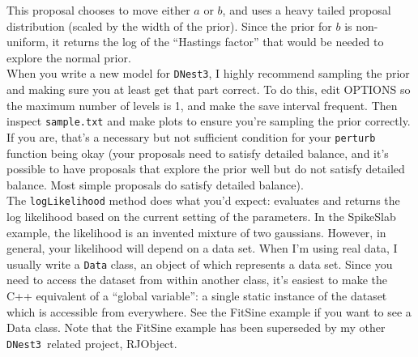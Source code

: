 \documentclass[a4paper, 11pt]{article}
\newcommand{\dnest}{{\tt DNest3}}
\begin{document}
This proposal chooses to move either $a$ or $b$, and uses a heavy tailed
proposal distribution (scaled by the width of the prior). Since the prior for
$b$ is non-uniform, it returns the log of the ``Hastings factor'' that would
be needed to explore the normal prior.\\

When you write a new model for \dnest, I highly recommend sampling the prior
and making sure you at least get that part correct. To do this, edit OPTIONS
so the maximum number of levels is 1, and make the save interval frequent.
Then inspect {\tt sample.txt} and make plots to ensure you're sampling the
prior correctly. If you are, that's a necessary but not sufficient condition
for your {\tt perturb} function being okay (your proposals need to satisfy
detailed balance, and it's possible to have proposals that explore the prior
well but do not satisfy detailed balance. Most simple proposals do satisfy
detailed balance).\\

The {\tt logLikelihood} method does what you'd expect: evaluates and returns
the log likelihood based on the current setting of the parameters. In the
SpikeSlab example, the likelihood is an invented mixture of two gaussians.
However, in general, your likelihood will depend on a data set. When I'm using
real data, I usually write a {\tt Data} class, an object of which represents
a data set. Since you need to access the dataset from within another class,
it's easiest to make the C++ equivalent of a ``global variable'': a single
static instance of the dataset which is accessible from everywhere. See
the FitSine example if you want to see a Data class. Note that the FitSine
example has been superseded by my other \dnest~related project, RJObject.
\end{document}

